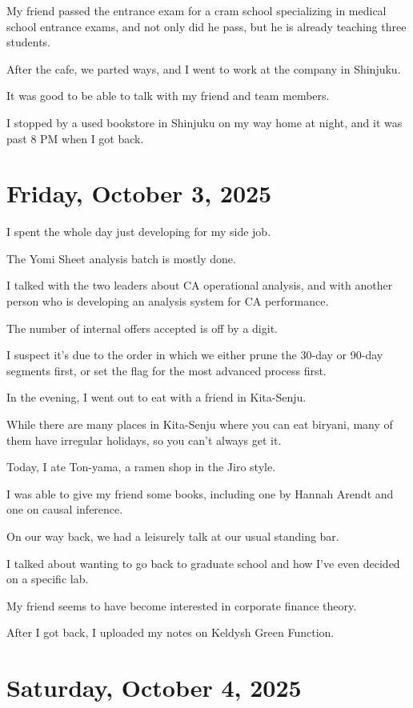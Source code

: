 \documentclass[uplatex]{jsarticle}
\begin{document}
My friend passed the entrance exam for a cram school specializing in medical school entrance exams, and not only did he pass, but he is already teaching three students.

After the cafe, we parted ways, and I went to work at the company in Shinjuku.

It was good to be able to talk with my friend and team members.

I stopped by a used bookstore in Shinjuku on my way home at night, and it was past 8 PM when I got back.


\section{\textbf{Friday, October 3, 2025}}

I spent the whole day just developing for my side job.

The Yomi Sheet analysis batch is mostly done.

I talked with the two leaders about CA operational analysis, and with another person who is developing an analysis system for CA performance.

The number of internal offers accepted is off by a digit.

I suspect it's due to the order in which we either prune the 30-day or 90-day segments first, or set the flag for the most advanced process first.

In the evening, I went out to eat with a friend in Kita-Senju.

While there are many places in Kita-Senju where you can eat biryani, many of them have irregular holidays, so you can't always get it.

Today, I ate Ton-yama, a ramen shop in the Jiro style.

I was able to give my friend some books, including one by Hannah Arendt and one on causal inference.

On our way back, we had a leisurely talk at our usual standing bar.

I talked about wanting to go back to graduate school and how I've even decided on a specific lab.

My friend seems to have become interested in corporate finance theory.

After I got back, I uploaded my notes on Keldysh Green Function.


\section{\textbf{Saturday, October 4, 2025}}
\end{document}
